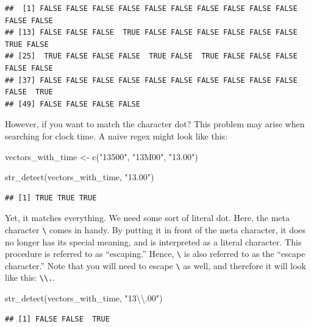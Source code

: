 \documentclass[
]{book}
\newenvironment{Shaded}{\begin{snugshade}}{\end{snugshade}}
\newcommand{\FunctionTok}[1]{\textcolor[rgb]{0.00,0.00,0.00}{#1}}
\newcommand{\NormalTok}[1]{#1}
\newcommand{\OtherTok}[1]{\textcolor[rgb]{0.56,0.35,0.01}{#1}}
\newcommand{\SpecialCharTok}[1]{\textcolor[rgb]{0.00,0.00,0.00}{#1}}
\newcommand{\StringTok}[1]{\textcolor[rgb]{0.31,0.60,0.02}{#1}}
\begin{document}
\begin{verbatim}
##  [1] FALSE FALSE FALSE FALSE FALSE FALSE FALSE FALSE FALSE FALSE FALSE FALSE
## [13] FALSE FALSE FALSE  TRUE FALSE FALSE FALSE FALSE FALSE FALSE  TRUE FALSE
## [25]  TRUE FALSE FALSE FALSE  TRUE FALSE  TRUE FALSE FALSE FALSE FALSE FALSE
## [37] FALSE FALSE FALSE FALSE FALSE FALSE FALSE FALSE FALSE FALSE FALSE  TRUE
## [49] FALSE FALSE FALSE FALSE
\end{verbatim}

However, if you want to match the character dot? This problem may arise when searching for clock time. A naive regex might look like this:

\begin{Shaded}
\begin{Highlighting}[]
\NormalTok{vectors\_with\_time }\OtherTok{\textless{}{-}} \FunctionTok{c}\NormalTok{(}\StringTok{"13500"}\NormalTok{, }\StringTok{"13M00"}\NormalTok{, }\StringTok{"13.00"}\NormalTok{)}

\FunctionTok{str\_detect}\NormalTok{(vectors\_with\_time, }\StringTok{"13.00"}\NormalTok{)}
\end{Highlighting}
\end{Shaded}

\begin{verbatim}
## [1] TRUE TRUE TRUE
\end{verbatim}

Yet, it matches everything. We need some sort of literal dot. Here, the meta character \texttt{\textbackslash{}} comes in handy. By putting it in front of the meta character, it does no longer has its special meaning, and is interpreted as a literal character. This procedure is referred to as ``escaping.'' Hence, \texttt{\textbackslash{}} is also referred to as the ``escape character.'' Note that you will need to escape \texttt{\textbackslash{}} as well, and therefore it will look like this: \texttt{\textbackslash{}\textbackslash{}.}.

\begin{Shaded}
\begin{Highlighting}[]
\FunctionTok{str\_detect}\NormalTok{(vectors\_with\_time, }\StringTok{"13}\SpecialCharTok{\textbackslash{}\textbackslash{}}\StringTok{.00"}\NormalTok{)}
\end{Highlighting}
\end{Shaded}

\begin{verbatim}
## [1] FALSE FALSE  TRUE
\end{verbatim}
\end{document}
